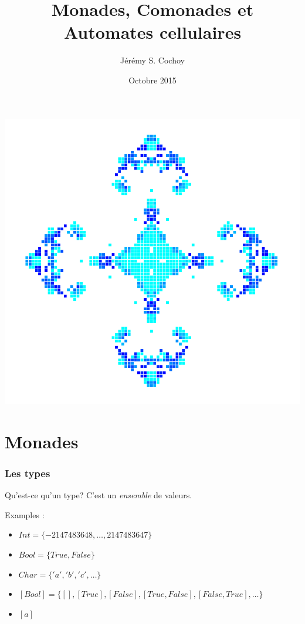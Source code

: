 \documentclass{beamer}
\begin{document}
\title{Monades, Comonades et Automates cellulaires}
\author{Jérémy S. Cochoy}
\date{Octobre 2015}


\begin{frame}
\titlepage
\end{frame}

\begin{frame}
\tableofcontents
\end{frame}

\begin{frame}

\begin{center}
\includegraphics[scale=0.3]{screen1.png}
\end{center}

\end{frame}

\section{Monades}

\begin{frame}
\frametitle{Les types}
\begin{block}{Qu'est-ce qu'un type?}
C'est un \emph{ensemble} de valeurs.
\end{block}
\pause
\begin{exampleblock}{Examples :}
\begin{itemize}
\item $Int = \{-2 147 483 648, \dots, 2 147 483 647\}$
\item $Bool = \{True, False\}$
\item $Char = \{'a', 'b', 'c' , \dots\}$
\pause
\item $[Bool] = \{[], [True], [False], [True, False], [False, True], \dots\}$
\pause
\item $[a]$
\end{itemize}

\end{exampleblock}
\end{frame}
\end{document}
